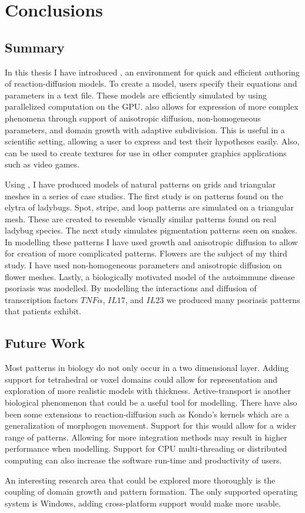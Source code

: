 \chapter{Conclusions}
\section{Summary}

In this thesis I have introduced \ProgramName{}, an environment for quick and efficient authoring of reaction-diffusion models. To create a model, users specify their equations and parameters in a text file. These models are efficiently simulated by using parallelized computation on the GPU. \ProgramName{} also allows for expression of more complex phenomena through support of anisotropic diffusion, non-homogeneous parameters, and domain growth with adaptive subdivision. This is useful in a scientific setting, allowing a user to express and test their hypotheses easily. Also, \ProgramName{} can be used to create textures for use in other computer graphics applications such as video games.

Using \ProgramName{}, I have produced models of natural patterns on grids and triangular meshes in a series of case studies. The first study is on patterns found on the elytra of ladybugs. Spot, stripe, and loop patterns are simulated on a triangular mesh. These are created to resemble visually similar patterns found on real ladybug species. The next study simulates pigmentation patterns seen on snakes. In modelling these patterns I have used growth and anisotropic diffusion to allow for creation of more complicated patterns. Flowers are the subject of my third study. I have used non-homogeneous parameters and anisotropic diffusion on flower meshes. Lastly, a biologically motivated model of the autoimmune disease psoriasis was modelled. By modelling the interactions and diffusion of transcription factors $TNF\alpha$, $IL17$, and $IL23$ we produced many psoriasis patterns that patients exhibit.

\section{Future Work}
Most patterns in biology do not only occur in a two dimensional layer. Adding support for tetrahedral or voxel domains could allow for representation and exploration of more realistic models with thickness. Active-transport is another biological phenomenon that could be a useful tool for modelling. There have also been some extensions to reaction-diffusion such as Kondo's kernels which are a generalization of morphogen movement. Support for this would allow for a wider range of patterns. Allowing for more integration methods may result in higher performance when modelling. Support for CPU multi-threading or distributed computing can also increase the software run-time and productivity of users. 

An interesting research area that could be explored more thoroughly is the coupling of domain growth and pattern formation. The only supported operating system is Windows, adding cross-platform support would make \ProgramName{} more usable.